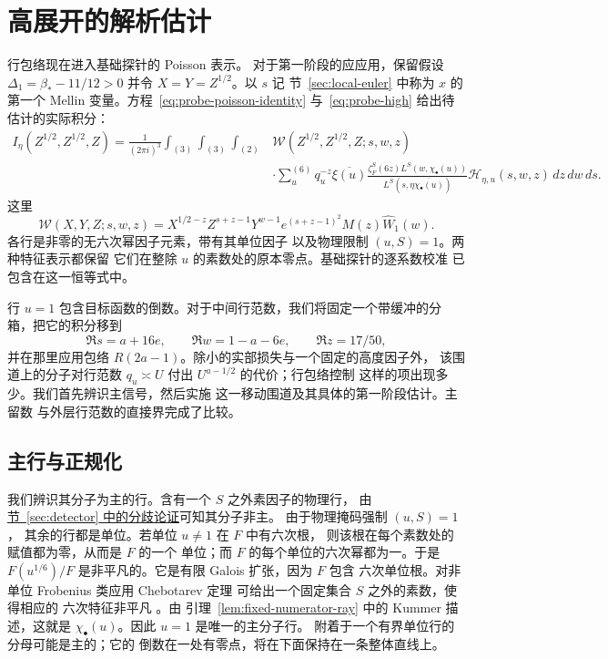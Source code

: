 \documentclass[11pt,a4paper]{article}
\numberwithin{equation}{section}
\numberwithin{figure}{section}
\theoremstyle{definition}
\theoremstyle{remark}
\begin{document}
\section{高展开的解析估计}
\label{sec:shared-analytic-estimates}

行包络现在进入基础探针的 Poisson 表示。
对于第一阶段的应应用，保留假设
$\Delta_1=\beta_*-11/12>0$ 并令
$X=Y=Z^{1/2}$。以 $s$ 记
节~\ref{sec:local-euler} 中称为 $x$ 的第一个 Mellin 变量。方程~\eqref{eq:probe-poisson-identity}
与~\eqref{eq:probe-high} 给出待估计的实际积分：
\[
\begin{split}
 I_\eta(Z^{1/2},Z^{1/2},Z)
 =\frac1{(2\pi i)^3}\int_{(3)}\int_{(3)}\int_{(2)}
 &\mathcal W(Z^{1/2},Z^{1/2},Z;s,w,z)\\
 &\cdot\sum_u^{(6)}q_u^{-z}\overline{\xi(u)}
 \frac{\zeta_F^S(6z)L^S(w,\chi_\bullet(u))}
      {L^S(s,\eta\overline{\chi_\bullet(u)})}
 \mathcal H_{\eta,u}(s,w,z)\,dz\,dw\,ds.
\end{split}
\]
这里
\[
 \mathcal W(X,Y,Z;s,w,z)=X^{1/2-z}Z^{s+z-1}Y^{w-1}
 e^{(s+z-1)^2}M(z)\widehat W_1(w).
\]
各行是非零的无六次幂因子元素，带有其单位因子
以及物理限制 $(u,S)=1$。两种特征表示都保留
它们在整除 $u$ 的素数处的原本零点。基础探针的逐系数校准
已包含在这一恒等式中。

行 $u=1$ 包含目标函数的倒数。对于中间行范数，我们将固定一个带缓冲的分箱，把它的积分移到
\[
 \Re s=a+16e,\qquad \Re w=1-a-6e,\qquad \Re z=17/50,
\]
并在那里应用包络 $R(2a-1)$。除小的实部损失与一个固定的高度因子外，
该围道上的分子对行范数 $q_u\asymp U$ 付出 $U^{a-1/2}$ 的代价；行包络控制
这样的项出现多少。我们首先辨识主信号，然后实施
这一移动围道及其具体的第一阶段估计。主留数
与外层行范数的直接界完成了比较。

\subsection{主行与正规化}

我们辨识其分子为主的行。含有一个 $S$ 之外素因子的物理行，
由 \hyperref[par:physical-row-ramification]{节~\ref*{sec:detector} 中的分歧论证}可知其分子非主。
由于物理掩码强制 $(u,S)=1$，
其余的行都是单位。若单位 $u\ne1$ 在 $F$ 中有六次根，
则该根在每个素数处的赋值都为零，从而是 $F$ 的一个
单位；而 $F$ 的每个单位的六次幂都为一。于是
$F(u^{1/6})/F$ 是非平凡的。它是有限 Galois 扩张，因为 $F$ 包含
六次单位根。对非单位 Frobenius 类应用 Chebotarev 定理
可给出一个固定集合 $S$ 之外的素数，使得相应的
六次特征非平凡 \cite[定理 1.1]{TZ}。由
引理~\ref{lem:fixed-numerator-ray} 中的 Kummer 描述，这就是
$\chi_\bullet(u)$。因此 $u=1$ 是唯一的主分子行。
附着于一个有界单位行的分母可能是主的；它的
倒数在一处有零点，将在下面保持在一条整体直线上。
\end{document}
